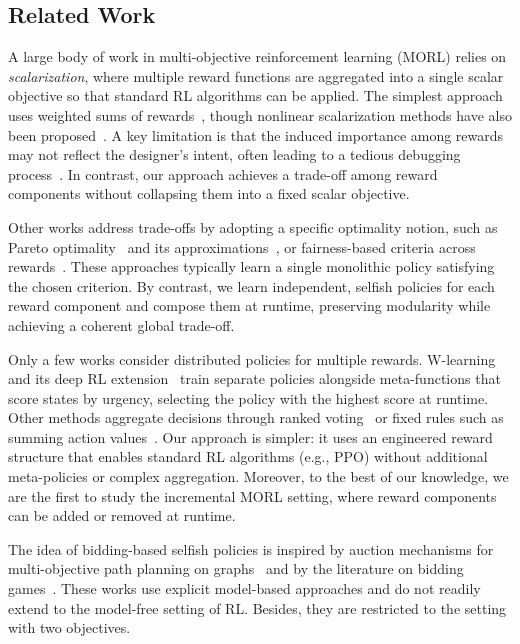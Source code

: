 \subsection*{Related Work}

A large body of work in multi-objective reinforcement learning (MORL) relies on \textit{scalarization}, where multiple reward functions are aggregated into a single scalar objective so that standard RL algorithms can be applied. The simplest approach uses weighted sums of rewards~\citep{gass1955computational}, though nonlinear scalarization methods have also been proposed~\citep{van2013scalarized}. A key limitation is that the induced importance among rewards may not reflect the designer’s intent, often leading to a tedious debugging process~\citep{hayes2022practicalguidemorl}. In contrast, our approach achieves a trade-off among reward components without collapsing them into a fixed scalar objective.

Other works address trade-offs by adopting a specific optimality notion, such as Pareto optimality~\citep{van2014multi} and its approximations~\citep{pirotta2015multi}, or fairness-based criteria across rewards~\citep{park2024max,byeon2025multi,siddique2020learning}. These approaches typically learn a single monolithic policy satisfying the chosen criterion. By contrast, we learn independent, selfish policies for each reward component and compose them at runtime, preserving modularity while achieving a coherent global trade-off.

Only a few works consider distributed policies for multiple rewards. W-learning~\citep{humphrys1995w} and its deep RL extension~\citep{rosero2024multi} train separate policies alongside meta-functions that score states by urgency, selecting the policy with the highest score at runtime. Other methods aggregate decisions through ranked voting~\citep{mendez2019multi} or fixed rules such as summing action values~\citep{russell2003q}. Our approach is simpler: it uses an engineered reward structure that enables standard RL algorithms (e.g., PPO) without additional meta-policies or complex aggregation. Moreover, to the best of our knowledge, we are the first to study the incremental MORL setting, where reward components can be added or removed at runtime.

The idea of bidding-based selfish policies is inspired by auction mechanisms for multi-objective path planning on graphs~\citep{avni2024auction} and by the literature on bidding games~\citep{lazarus1999combinatorial,avni2019infinite,avni2025bidding}. These works use explicit model-based approaches and do not readily extend to the model-free setting of RL.
Besides, they are restricted to the setting with two objectives.



